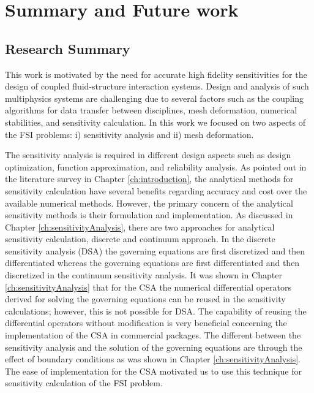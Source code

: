 \chapter{Summary and Future work}
\section{Research Summary}
This work is motivated by the need for accurate high fidelity sensitivities for the design of coupled fluid-structure interaction systems. Design and analysis of such multiphysics systems are challenging due to several factors such as the coupling algorithms for data transfer between disciplines, mesh deformation, numerical stabilities, and sensitivity calculation. In this work we focused on two aspects of the FSI problems: i) sensitivity analysis and ii) mesh deformation.

The sensitivity analysis is required in different design aspects such as design optimization, function approximation, and reliability analysis. As pointed out in the literature survey in Chapter \ref{ch:introduction}, the analytical methods for sensitivity calculation have several benefits regarding accuracy and cost over the available numerical methods. However, the primary concern of the analytical sensitivity methods is their formulation and implementation. As discussed in Chapter \ref{ch:sensitivityAnalysis}, there are two approaches for analytical sensitivity calculation, discrete and continuum approach. In the discrete sensitivity analysis (DSA) the governing equations are first discretized and then differentiated whereas the governing equations are first differentiated and then discretized in the continuum sensitivity analysis. It was shown in Chapter \ref{ch:sensitivityAnalysis} that for the CSA the numerical differential operators derived for solving the governing equations can be reused in the sensitivity calculations; however, this is not possible for DSA. The capability of reusing the differential operators without modification is very beneficial concerning the implementation of the CSA in commercial packages. The different between the sensitivity analysis and the solution of the governing equations are through the effect of boundary conditions as was shown in Chapter \ref{ch:sensitivityAnalysis}. The ease of implementation for the CSA motivated us to use this technique for sensitivity calculation of the FSI problem.

